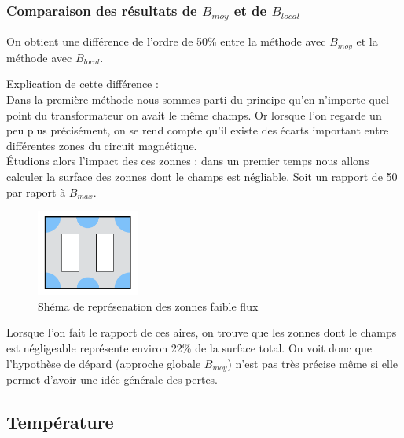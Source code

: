 \subsubsection{Comparaison des résultats de $B_{moy}$ et de $B_{local}$}

On obtient une différence de l'ordre de 50\% entre la méthode avec $B_{moy}$  et la méthode avec $B_{local}$.

Explication de cette différence : \\
	Dans la première méthode nous sommes parti du principe qu'en n'importe quel point du transformateur on avait le même champs. Or lorsque l'on regarde un peu plus précisément, on se rend compte qu'il existe des écarts important entre différentes zones du circuit magnétique.\\
Étudions alors l'impact des ces zonnes : dans un premier temps nous allons calculer la surface des zonnes dont le champs est négliable. Soit un rapport de 50 par raport à $B_{max}$.

\begin{figure}[ht]
	\begin{center}
	\includegraphics[width=0.30\textwidth]{images/TP3_zones_mortes}
	\caption{Shéma de représenation des zonnes faible flux}\label{img:RepChamps}
	\end{center}
\end{figure}
\FloatBarrier

Lorsque l'on fait le rapport de ces aires, on trouve que les zonnes dont le champs est négligeable représente environ 22\% de la surface total. On voit donc que l'hypothèse de dépard (approche globale $B_{moy}$) n'est pas très précise même si elle permet d'avoir une idée générale des pertes.


\subsection{Température}

